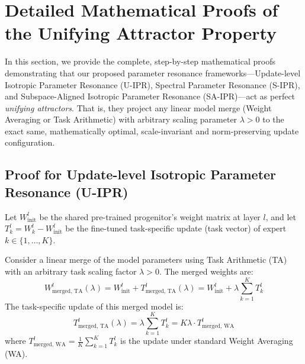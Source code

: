 \documentclass{article}
\begin{document}
\section{Detailed Mathematical Proofs of the Unifying Attractor Property}
\label{app:proofs}

In this section, we provide the complete, step-by-step mathematical proofs demonstrating that our proposed parameter resonance frameworks---Update-level Isotropic Parameter Resonance (U-IPR), Spectral Parameter Resonance (S-IPR), and Subspace-Aligned Isotropic Parameter Resonance (SA-IPR)---act as perfect \textit{unifying attractors}. That is, they project any linear model merge (Weight Averaging or Task Arithmetic) with arbitrary scaling parameter $\lambda > 0$ to the exact same, mathematically optimal, scale-invariant and norm-preserving update configuration.

\subsection{Proof for Update-level Isotropic Parameter Resonance (U-IPR)}
Let $W_{\text{init}}^l$ be the shared pre-trained progenitor's weight matrix at layer $l$, and let $T_k^l = W_k^l - W_{\text{init}}^l$ be the fine-tuned task-specific update (task vector) of expert $k \in \{1, \dots, K\}$.

Consider a linear merge of the model parameters using Task Arithmetic (TA) with an arbitrary task scaling factor $\lambda > 0$. The merged weights are:
\begin{equation}
    W_{\text{merged, TA}}^l(\lambda) = W_{\text{init}}^l + T_{\text{merged, TA}}^l(\lambda) = W_{\text{init}}^l + \lambda \sum_{k=1}^K T_k^l
\end{equation}
The task-specific update of this merged model is:
\begin{equation}
    T_{\text{merged, TA}}^l(\lambda) = \lambda \sum_{k=1}^K T_k^l = K \lambda \cdot T_{\text{merged, WA}}^l
\end{equation}
where $T_{\text{merged, WA}}^l = \frac{1}{K} \sum_{k=1}^K T_k^l$ is the update under standard Weight Averaging (WA).
\end{document}
